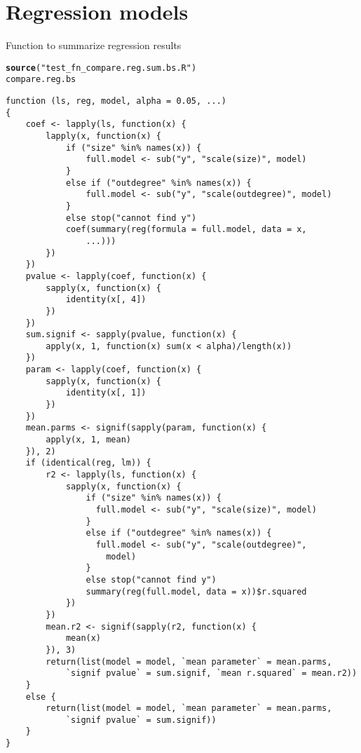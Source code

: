 \documentclass[]{revtex4}\usepackage[]{graphicx}\usepackage[]{color}
\makeatletter
\newcommand{\hlstr}[1]{\textcolor[rgb]{0.192,0.494,0.8}{#1}}%
\newcommand{\hlstd}[1]{\textcolor[rgb]{0.345,0.345,0.345}{#1}}%
\newcommand{\hlkwd}[1]{\textcolor[rgb]{0.737,0.353,0.396}{\textbf{#1}}}%
\newenvironment{kframe}{%
 \def\at@end@of@kframe{}%
 \ifinner\ifhmode%
  \def\at@end@of@kframe{\end{minipage}}%
  \begin{minipage}{\columnwidth}%
 \fi\fi%
 \def\FrameCommand##1{\hskip\@totalleftmargin \hskip-\fboxsep
 \colorbox{shadecolor}{##1}\hskip-\fboxsep
     \hskip-\linewidth \hskip-\@totalleftmargin \hskip\columnwidth}%
 \MakeFramed {\advance\hsize-\width
   \@totalleftmargin\z@ \linewidth\hsize
   \@setminipage}}%
 {\par\unskip\endMakeFramed%
 \at@end@of@kframe}
\newenvironment{knitrout}{}{} %
\makeatother
\begin{document}
\section*{Regression models}

Function to summarize regression results
\begin{knitrout}
\color{fgcolor}\begin{kframe}
\begin{alltt}
\hlkwd{source}\hlstd{(}\hlstr{"test_fn_compare.reg.sum.bs.R"}\hlstd{)}
\hlstd{compare.reg.bs}
\end{alltt}
\begin{verbatim}
function (ls, reg, model, alpha = 0.05, ...) 
{
    coef <- lapply(ls, function(x) {
        lapply(x, function(x) {
            if ("size" %in% names(x)) {
                full.model <- sub("y", "scale(size)", model)
            }
            else if ("outdegree" %in% names(x)) {
                full.model <- sub("y", "scale(outdegree)", model)
            }
            else stop("cannot find y")
            coef(summary(reg(formula = full.model, data = x, 
                ...)))
        })
    })
    pvalue <- lapply(coef, function(x) {
        sapply(x, function(x) {
            identity(x[, 4])
        })
    })
    sum.signif <- sapply(pvalue, function(x) {
        apply(x, 1, function(x) sum(x < alpha)/length(x))
    })
    param <- lapply(coef, function(x) {
        sapply(x, function(x) {
            identity(x[, 1])
        })
    })
    mean.parms <- signif(sapply(param, function(x) {
        apply(x, 1, mean)
    }), 2)
    if (identical(reg, lm)) {
        r2 <- lapply(ls, function(x) {
            sapply(x, function(x) {
                if ("size" %in% names(x)) {
                  full.model <- sub("y", "scale(size)", model)
                }
                else if ("outdegree" %in% names(x)) {
                  full.model <- sub("y", "scale(outdegree)", 
                    model)
                }
                else stop("cannot find y")
                summary(reg(full.model, data = x))$r.squared
            })
        })
        mean.r2 <- signif(sapply(r2, function(x) {
            mean(x)
        }), 3)
        return(list(model = model, `mean parameter` = mean.parms, 
            `signif pvalue` = sum.signif, `mean r.squared` = mean.r2))
    }
    else {
        return(list(model = model, `mean parameter` = mean.parms, 
            `signif pvalue` = sum.signif))
    }
}
\end{verbatim}
\end{kframe}
\end{knitrout}
\end{document}
